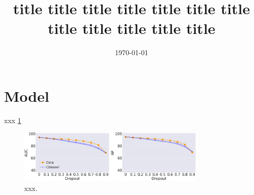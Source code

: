 \documentclass{article}
\title{\bf title title title title title title title title title title title title}
\date{\today}
\begin{document}
\maketitle
\tableofcontents

\newpage
\section{Model}
xxx\citep{aaa} \ref{fig1}

\begin{figure}[!htp]
\begin{center}
\centerline{\includegraphics[width=0.8\textwidth]{./Figures/Dropout.png}}
\end{center}
\caption{xxx.}
\label{fig1}
\end{figure}



\newpage


\end{document}
